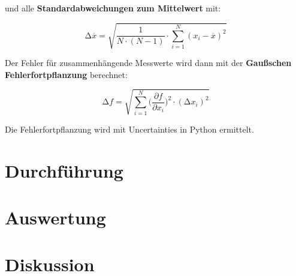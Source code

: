 und alle \textbf{Standardabweichungen zum Mittelwert} mit:

\begin{equation}
    \increment\overline{x} = \sqrt{\frac{1}{N\cdot(N-1)}\cdot\sum_{i=1}^N (x_i-\overline{x})^2}
    \label{eqn:St_Mittelwert}
\end{equation}

Der Fehler für zusammenhängende Messwerte wird dann mit der \textbf{Gaußschen Fehlerfortpflanzung} berechnet:

\begin{equation}
    \increment{f} = \sqrt{ \sum_{i = 1}^{N}  \biggl(\frac{\partial{f}}{\partial{x_i}}\biggr)^2\cdot(\increment{x_i})^2}
    \label{eqn:Gauss}
\end{equation}

Die Fehlerfortpflanzung wird mit Uncertainties in Python \cite{uncertainties} ermittelt.


\section{Durchführung}



\section{Auswertung}



\section{Diskussion}


\newpage
\printbibliography

